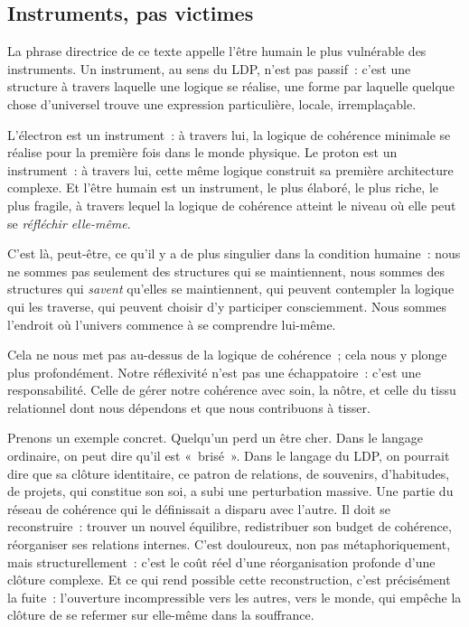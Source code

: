 \documentclass[12pt, a4paper, openright]{book}
\begin{document}
\subsection*{Instruments, pas victimes}

La phrase directrice de ce texte appelle l'être humain \og le plus vulnérable des instruments\fg{}. Un instrument, au sens du LDP, n'est pas passif~: c'est une structure à travers laquelle une logique se réalise, une forme par laquelle quelque chose d'universel trouve une expression particulière, locale, irremplaçable.

\medskip

L'électron est un instrument~: à travers lui, la logique de cohérence minimale se réalise pour la première fois dans le monde physique. Le proton est un instrument~: à travers lui, cette même logique construit sa première architecture complexe. Et l'être humain est un instrument, le plus élaboré, le plus riche, le plus fragile, à travers lequel la logique de cohérence atteint le niveau où elle peut se \emph{réfléchir elle-même}.

\medskip

C'est là, peut-être, ce qu'il y a de plus singulier dans la condition humaine~: nous ne sommes pas seulement des structures qui se maintiennent, nous sommes des structures qui \emph{savent} qu'elles se maintiennent, qui peuvent contempler la logique qui les traverse, qui peuvent choisir d'y participer consciemment. Nous sommes l'endroit où l'univers commence à se comprendre lui-même.

\medskip

Cela ne nous met pas au-dessus de la logique de cohérence~; cela nous y plonge plus profondément. Notre réflexivité n'est pas une échappatoire~: c'est une responsabilité. Celle de gérer notre cohérence avec soin, la nôtre, et celle du tissu relationnel dont nous dépendons et que nous contribuons à tisser.

\medskip

Prenons un exemple concret. Quelqu'un perd un être cher. Dans le langage ordinaire, on peut dire qu'il est «~brisé~». Dans le langage du LDP, on pourrait dire que sa clôture identitaire, ce patron de relations, de souvenirs, d'habitudes, de projets, qui constitue son soi, a subi une perturbation massive. Une partie du réseau de cohérence qui le définissait a disparu avec l'autre. Il doit se reconstruire~: trouver un nouvel équilibre, redistribuer son budget de cohérence, réorganiser ses relations internes. C'est douloureux, non pas métaphoriquement, mais structurellement~: c'est le coût réel d'une réorganisation profonde d'une clôture complexe. Et ce qui rend possible cette reconstruction, c'est précisément la fuite~: l'ouverture incompressible vers les autres, vers le monde, qui empêche la clôture de se refermer sur elle-même dans la souffrance.
\end{document}

